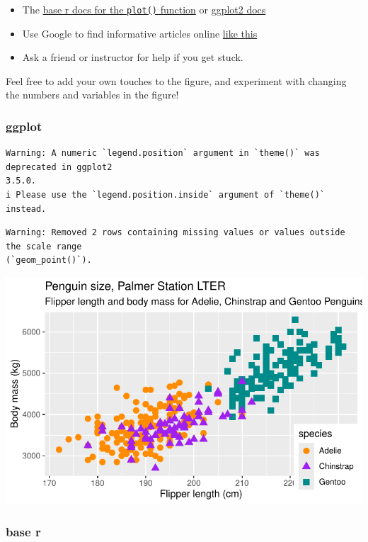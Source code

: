 \documentclass[
  letterpaper,
  DIV=11,
  numbers=noendperiod]{scrreprt}
\begin{document}
\begin{itemize}
\item
  The \href{https://rdrr.io/r/base/plot.html}{base r docs for the
  \texttt{plot()} function} or
  \href{https://ggplot2.tidyverse.org/articles/ggplot2-specs.html}{ggplot2
  docs}
\item
  Use Google to find informative articles online
  \href{https://www.statology.org/ggplot-legend-position/}{like this}
\item
  Ask a friend or instructor for help if you get stuck.
\end{itemize}

Feel free to add your own touches to the figure, and experiment with
changing the numbers and variables in the figure!

\hypertarget{ggplot-4}{%
\subsubsection{ggplot}\label{ggplot-4}}

\begin{verbatim}
Warning: A numeric `legend.position` argument in `theme()` was deprecated in ggplot2
3.5.0.
i Please use the `legend.position.inside` argument of `theme()` instead.
\end{verbatim}

\begin{verbatim}
Warning: Removed 2 rows containing missing values or values outside the scale range
(`geom_point()`).
\end{verbatim}

\includegraphics{scripts/02_dataViz/class4_files/figure-pdf/unnamed-chunk-2-1.pdf}

\hypertarget{base-r-4}{%
\subsubsection{base r}\label{base-r-4}}
\end{document}
